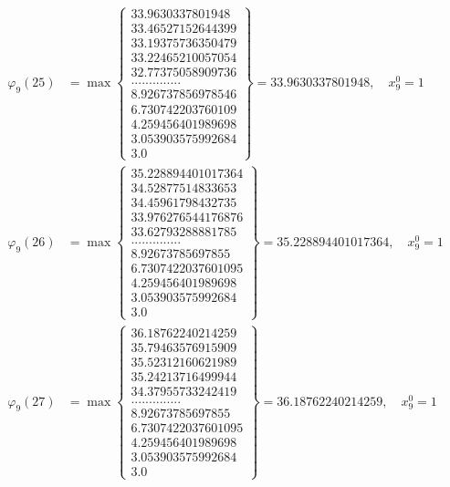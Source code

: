 \documentclass{article}
\begin{document}
\begin{align*}
  
  
  
\varphi_{9}(25) &= \max \left\{ \begin{array}{c}
33.9630337801948 \\
 33.46527152644399 \\
 33.19375736350479 \\
 33.22465210057054 \\
 32.77375058909736 \\
 .............. \\
 8.926737856978546 \\
 6.730742203760109 \\
 4.259456401989698 \\
 3.053903575992684 \\
 3.0
\end{array} \right\} = 33.9630337801948, \quad x_{9}^0 = 1\\
  
  
  
  
\varphi_{9}(26) &= \max \left\{ \begin{array}{c}
35.228894401017364 \\
 34.52877514833653 \\
 34.45961798432735 \\
 33.976276544176876 \\
 33.62793288881785 \\
 .............. \\
 8.92673785697855 \\
 6.7307422037601095 \\
 4.259456401989698 \\
 3.053903575992684 \\
 3.0
\end{array} \right\} = 35.228894401017364, \quad x_{9}^0 = 1\\
  
  
  
  
\varphi_{9}(27) &= \max \left\{ \begin{array}{c}
36.18762240214259 \\
 35.79463576915909 \\
 35.52312160621989 \\
 35.24213716499944 \\
 34.37955733242419 \\
 .............. \\
 8.92673785697855 \\
 6.7307422037601095 \\
 4.259456401989698 \\
 3.053903575992684 \\
 3.0
\end{array} \right\} = 36.18762240214259, \quad x_{9}^0 = 1\\
  

\end{align*}
\end{document}
